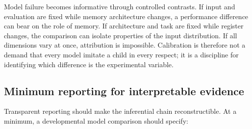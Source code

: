 Model failure becomes informative through controlled contrasts. If input and evaluation are fixed while memory architecture changes, a performance difference can bear on the role of memory. If architecture and task are fixed while register changes, the comparison can isolate properties of the input distribution. If all dimensions vary at once, attribution is impossible. Calibration is therefore not a demand that every model imitate a child in every respect; it is a discipline for identifying which difference is the experimental variable.

\subsection{Minimum reporting for interpretable evidence}
\label{sec:litreview:reporting}

Transparent reporting should make the inferential chain reconstructible. At a minimum, a developmental model comparison should specify:

